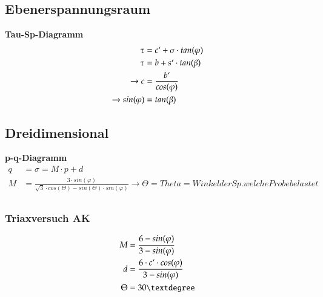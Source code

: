 \begin{minipage}{\linewidth}
\subsection{Ebenerspannungsraum}

\textbf{Tau-Sp-Diagramm}
	\begin{align*}
		\tau 		&= c`+ \sigma \cdot tan(\varphi) \\
		\tau		&= b + s`\cdot tan(\beta) \\
		\rightarrow c&= \frac{b`}{cos(\varphi)} \\
		\rightarrow sin(\varphi) &= tan(\beta) \\
	\end{align*}

\subsection{Dreidimensional}

\textbf{p-q-Diagramm} \\
	\begin{align*}
		q			&= \sigma = M \cdot p + d \\
		M			&= \frac{3 \cdot sin(\varphi)}{\sqrt{3} \cdot cos(\Theta) - sin(\Theta) \cdot sin(\varphi)} \rightarrow \Theta = Theta =Winkel der Sp. welche Probe belastet\\
	\end{align*}
	
	\subsubsection{Triaxversuch AK}
	\begin{align*}
		M			&= \frac{6 - sin(\varphi)}{3 - sin(\varphi)} \\
		d			&= \frac{6 \cdot c`\cdot cos(\varphi)}{3 - sin(\varphi)} \\
		\Theta		&= 30°
	\end{align*}
\end{minipage}
